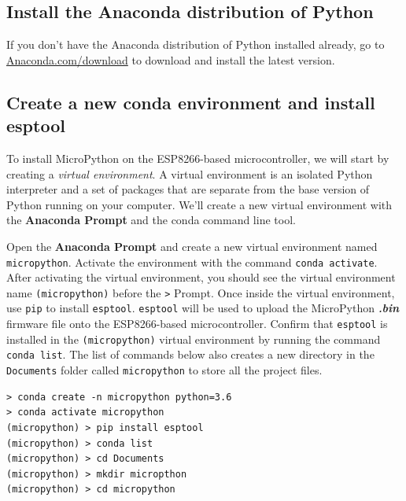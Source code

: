 \documentclass{book}
\begin{document}
    
        \subsection{Install the Anaconda distribution of
Python}\label{install-the-anaconda-distribution-of-python}
    




    
        If you don't have the Anaconda distribution of Python installed already,
go to \href{https://www.anaconda.com/download/}{Anaconda.com/download}
to download and install the latest version.
    




    
        \subsection{\texorpdfstring{Create a new conda environment and install
\textbf{esptool}}{Create a new conda environment and install esptool}}\label{create-a-new-conda-environment-and-install-esptool}
    




    
        To install MicroPython on the ESP8266-based microcontroller, we will
start by creating a \emph{virtual environment}. A virtual environment is
an isolated Python interpreter and a set of packages that are separate
from the base version of Python running on your computer. We'll create a
new virtual environment with the \textbf{Anaconda Prompt} and the conda
command line tool.

Open the \textbf{Anaconda Prompt} and create a new virtual environment
named \lstinline!micropython!. Activate the environment with the command
\lstinline!conda activate!. After activating the virtual environment,
you should see the virtual environment name \lstinline!(micropython)!
before the \lstinline!>! Prompt. Once inside the virtual environment,
use \lstinline!pip! to install \lstinline!esptool!. \lstinline!esptool!
will be used to upload the MicroPython \textbf{\emph{.bin}} firmware
file onto the ESP8266-based microcontroller. Confirm that
\lstinline!esptool! is installed in the \lstinline!(micropython)!
virtual environment by running the command \lstinline!conda list!. The
list of commands below also creates a new directory in the
\lstinline!Documents! folder called \lstinline!micropython! to store all
the project files.

\begin{lstlisting}
> conda create -n micropython python=3.6
> conda activate micropython
(micropython) > pip install esptool
(micropython) > conda list
(micropython) > cd Documents
(micropython) > mkdir micropthon
(micropython) > cd micropython
\end{lstlisting}
    
\end{document}

